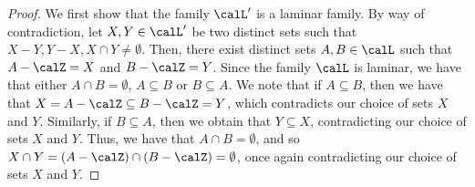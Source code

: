 \documentclass{article}
\begin{document}
\projectionLaminarFamily*
\begin{proof}
    We first show that the family $\calL'$ is a laminar family. By way of contradiction, let $X,Y \in \calL'$ be two distinct sets such that $X-Y, Y-X, X\cap Y \not = \emptyset$. Then, there exist distinct sets $A, B \in \calL$ such that $A - \calZ = X$ and $B - \calZ = Y$. Since the family $\calL$ is laminar, we have that either $A\cap B = \emptyset$, $A \subseteq B$ or $B\subseteq A$. We note that if $A\subseteq B$, then we have that $X = A - \calZ \subseteq B - \calZ = Y$, which contradicts our choice of sets $X$ and $Y$. Similarly, if $B\subseteq A$, then we obtain that $Y \subseteq X$, contradicting our choice of sets $X$ and $Y$. Thus, we have that $A\cap B = \emptyset$, and so $X\cap Y = (A - \calZ)\cap(B - \calZ) = \emptyset$, once again contradicting our choice of sets $X$ and $Y$. 


\end{proof}
\end{document}
